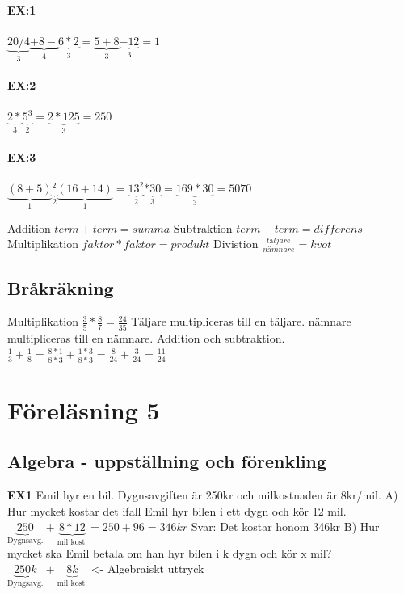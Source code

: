 \documentclass[a4paper,11pt]{article}
\begin{document}
\begin{flushleft}
\paragraph{EX:1}
$ \underbrace{20/4}_{\text{3}}\underbrace{+8-}_{\text{4}}\underbrace{6*2}_{\text{3}}=\underbrace{5+8}_{\text{3}}\underbrace{-12}_{\text{3}}=1 $\newline
\paragraph{EX:2}
$ \underbrace{2*}_{\text{3}}\underbrace{5^3}_{\text{2}}=\underbrace{2*125}_{\text{3}}=250 $
\paragraph{EX:3}
$\underbrace{(8+5)}_{\text{1}}\underbrace{^2}_{\text{2}}\underbrace{(16+14)}_{\text{1}}=\underbrace{13^2}_{\text{2}}\underbrace{*30}_{\text{3}}=\underbrace{169*30}_{\text{3}}=5070 $

Addition $ term+term=summa $
Subtraktion $ term-term=differens $
Multiplikation $ faktor*faktor=produkt $
Divistion $ \frac{täljare}{nämnare}=kvot $
\subsection{Bråkräkning}
Multiplikation $ \frac{3}{5}*\frac{8}{7}=\frac{24}{35} $\newline
Täljare multipliceras till en täljare.\newline
nämnare multipliceras till en nämnare.\newline
Addition och subtraktion.\newline
$ \frac{1}{3}+\frac{1}{8}=\frac{8*1}{8*3}+\frac{1*3}{8*3}=\frac{8}{24}+\frac{3}{24}=\frac{11}{24} $

\newpage
\section{Föreläsning 5}
\subsection{Algebra - uppställning och förenkling}
\textbf{EX1}\newline
Emil hyr en bil. Dygnsavgiften är 250kr och milkostnaden är 8kr/mil.\newline
A) Hur mycket kostar det ifall Emil hyr bilen i ett dygn och kör 12 mil.\newline
$ \underbrace{250}_{\text{Dygnsavg.}} + \underbrace{8*12}_{\text{mil kost.}} = 250+96 = 346kr $
Svar: Det kostar honom 346kr \newline\newline
B) Hur mycket ska Emil betala om han hyr bilen i k dygn och kör x mil?\newline\newline
$ \underbrace{250k}_{\text{Dyngsavg.}} + \underbrace{8k}_{\text{mil kost.}}$ <- Algebraiskt uttryck\newline\newline



\end{flushleft}
\end{document}
